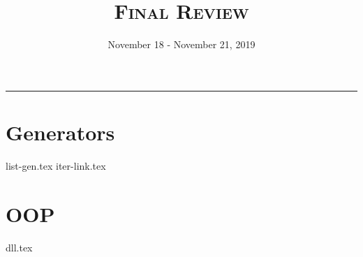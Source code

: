 \documentclass{exam}
\title{\textsc{Final Review}}
\date{November 18 - November 21, 2019}
\begin{document}
\maketitle\rule{\textwidth}{0.15em}
\fontsize{12}{15}\selectfont

\section{Generators}
\begin{questions}
{list-gen.tex}
{iter-link.tex}
\end{questions}

\section{OOP}
\begin{questions}
{dll.tex}

\end{questions}
\end{document}
